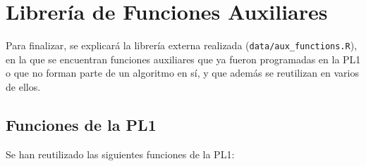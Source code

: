 \documentclass[12pt]{report}\usepackage[]{graphicx}\usepackage[dvipsnames]{xcolor}
\begin{document}
 	\chapter{Librería de Funciones Auxiliares}\label{App:Libreria}
 	
	 	Para finalizar, se explicará la librería externa realizada (\texttt{data/aux\_functions.R}), en la que se encuentran funciones auxiliares que ya fueron programadas en la PL1 o que no forman parte de un algoritmo en sí, y que además se reutilizan en varios de ellos.
	 	
	 	\section{Funciones de la PL1}
	 	
	 	Se han reutilizado las siguientes funciones de la PL1:
	 	
\end{document}
